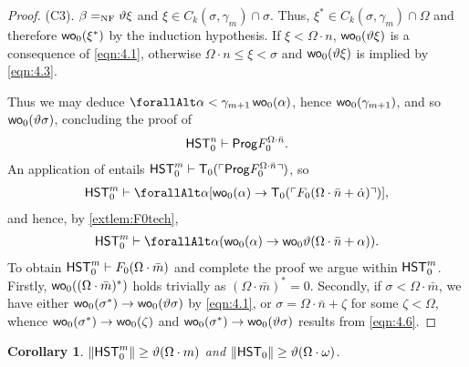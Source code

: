 \documentclass[UKenglish,cleveref,DIV=12]{scrartcl}
\let\forall\forallAlt
\newtheorem{corollary}[lemma]{Corollary}
\theoremstyle{definition}
\theoremstyle{definition}
\begin{document}
\begin{proof}
(C3). $\beta=_{\mathrm{NF}}\vartheta\xi$ and $\xi\in C_k(\sigma,\gamma_m)\cap\sigma$. Thus,
$\xi^*\in C_k(\sigma,\gamma_m)\cap\Omega$ and therefore $\mathsf{wo}_0(\xi^*)$ by the
induction hypothesis. If $\xi<\Omega\cdot n$, $\mathsf{wo}_0(\vartheta\xi)$ is a
consequence of \cref{eqn:4.1}, otherwise $\Omega\cdot n\le\xi<\sigma$ and
$\mathsf{wo}_0(\vartheta\xi)$ is implied by \cref{eqn:4.3}.

Thus we may deduce $\forall\alpha<\gamma_{m+1}\,\wo_0(\alpha)$, hence
$\mathsf{wo}_0(\gamma_{m+1})$, and so $\mathsf{wo}_0(\vartheta\sigma)$, concluding the proof of
\begin{align}\label{eqn:4.2}
  \mathsf{HST}_0^n\vdash\mathsf{Prog} F^{\Omega\cdot\bar n}_0.
\end{align}
An application of  entails $\mathsf{HST}_0^m\vdash \mathsf{T}_0(\ulcorner{\mathsf{Prog}F^{\Omega\cdot\bar n}_0}\urcorner)$, so
\begin{align*}
  \HST_0^m\proves\forall\alpha[\wo_0(\alpha)\rightarrow
   \T_0(\gn{F_0(\Omega\cdot\bar n+\dot\alpha)})],
\end{align*}
and hence, by \cref{extlem:F0tech},
\begin{align}\label{eqn:4.6}
  \HST_0^m\proves\forall\alpha(\wo_0(\alpha)\rightarrow\wo_0\vartheta(\Omega\cdot\bar
  n+\alpha)).
\end{align}
To obtain $\mathsf{HST}_0^m\vdash F_0(\Omega\cdot\bar m)$ and complete the proof we
argue within $\mathsf{HST}_0^m$. Firstly, $\mathsf{wo}_0((\Omega\cdot\bar m)^*)$ holds trivially as $(\Omega\cdot\bar m)^*=0$. Secondly, if
$\sigma<\Omega\cdot\bar m$, we have either $\mathsf{wo}_0(\sigma^*)\rightarrow
\mathsf{wo}_0(\vartheta\sigma)$ by \cref{eqn:4.1}, or $\sigma=\Omega\cdot\bar
n+\zeta$ for some $\zeta<\Omega$, whence $\mathsf{wo}_0(\sigma^*)\rightarrow \mathsf{wo}_0(\zeta)$
and $\mathsf{wo}_0(\sigma^*)\rightarrow \mathsf{wo}_0(\vartheta\sigma)$ results from
\cref{eqn:4.6}.
\end{proof}
\begin{corollary}\label{extcor:F0lowerbound}
 $\lVert{\mathsf{HST}_0^m}\rVert\ge\vartheta(\Omega\cdot m)$ and $\lVert{\mathsf{HST}_0}\rVert\ge\vartheta(\Omega\cdot\omega)$.
\end{corollary}
\end{document}
